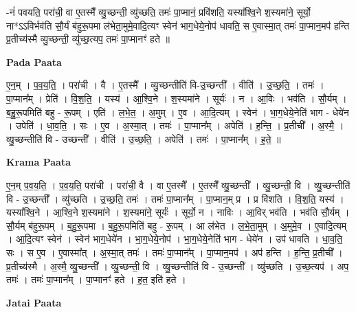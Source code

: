 \documentclass[17pt]{extarticle}
\begin{document}
-नं॑ पवयति॒ परा॑ची॒ वा ए॒तस्मै᳚ व्यु॒च्छन्ती॒ व्यु॑च्छति॒ तमः॑ पा॒प्मानं॒ प्रवि॑शति॒ यस्या᳚श्वि॒ने श॒स्यमा॑ने॒ सूर्यो॒ ना*ऽऽविर्भव॑ति सौ॒र्यं ब॑हुरू॒पमा ल॑भेता॒मुमे॒वादि॒त्यꣳ स्वेन॑ भाग॒धेये॒नोप॑ धावति॒ स ए॒वास्मा॒त् तमः॑ पा॒प्मान॒मप॑ हन्ति प्र॒तीच्य॑स्मै व्यु॒च्छन्ती॒ व्यु॑च्छ॒त्यप॒ तमः॑ पा॒प्मानꣳ॑ हते ॥ \newline

\textbf{Pada Paata} \newline

ए॒न॒म् । प॒व॒य॒ति॒ । परा॑ची । वै । ए॒तस्मै᳚ । व्यु॒च्छन्तीति॑ वि-उ॒च्छन्ती᳚ । वीति॑ । उ॒च्छ॒ति॒ । तमः॑ । पा॒प्मान᳚म् । प्रेति॑ । वि॒श॒ति॒ । यस्य॑ । आ॒श्वि॒ने । श॒स्यमा॑ने । सूर्यः॑ । न । आ॒विः । भव॑ति । सौ॒र्यम् । ब॒हु॒रू॒पमिति॑ बहु - रू॒पम् । एति॑ । ल॒भे॒त॒ । अ॒मुम् । ए॒व । आ॒दि॒त्यम् । स्वेन॑ । भा॒ग॒धेये॒नेति॑ भाग - धेये॑न । उपेति॑ । धा॒व॒ति॒ । सः । ए॒व । अ॒स्मा॒त् । तमः॑ । पा॒प्मान᳚म् । अपेति॑ । ह॒न्ति॒ । प्र॒तीची᳚ । अ॒स्मै॒ । व्यु॒च्छन्तीति॑ वि - उच्छन्ती᳚ । वीति॑ । उ॒च्छ॒ति॒ । अपेति॑ । तमः॑ । पा॒प्मान᳚म् । ह॒ते॒ ॥  \newline


\textbf{Krama Paata} \newline

ए॒न॒म् प॒व॒य॒ति॒ । प॒व॒य॒ति॒ परा॑ची । परा॑ची॒ वै । वा ए॒तस्मै᳚ । ए॒तस्मै᳚ व्यु॒च्छन्ती᳚ । व्यु॒च्छन्ती॒ वि । व्यु॒च्छन्तीति॑ वि - उ॒च्छन्ती᳚ । व्यु॑च्छति । उ॒च्छ॒ति॒ तमः॑ । तमः॑ पा॒प्मान᳚म् । पा॒प्मान॒म् प्र । प्र वि॑शति । वि॒श॒ति॒ यस्य॑ । यस्या᳚श्वि॒ने । आ॒श्वि॒ने श॒स्यमा॑ने । श॒स्यमा॑ने॒ सूर्यः॑ । सूर्यो॒ न । नाविः । आ॒विर् भव॑ति । भव॑ति सौ॒र्यम् । सौ॒र्यम् ब॑हुरू॒पम् । ब॒हु॒रू॒पमा । ब॒हु॒रू॒पमिति॑ बहु - रू॒पम् । आ ल॑भेत । ल॒भे॒ता॒मुम् । अ॒मुमे॒व । ए॒वादि॒त्यम् । आ॒दि॒त्यꣳ स्वेन॑ । स्वेन॑ भाग॒धेये॑न । भा॒ग॒धेये॒नोप॑ । भा॒ग॒धेये॒नेति॑ भाग - धेये॑न । उप॑ धावति । धा॒व॒ति॒ सः । स ए॒व । ए॒वास्मा᳚त् । अ॒स्मा॒त् तमः॑ । तमः॑ पा॒प्मान᳚म् । पा॒प्मान॒मप॑ । अप॑ हन्ति । ह॒न्ति॒ प्र॒तीची᳚ । प्र॒तीच्य॑स्मै । अ॒स्मै॒ व्यु॒च्छन्ती᳚ । व्यु॒च्छन्ती॒ वि । व्यु॒च्छन्तीति॑ वि - उ॒च्छन्ती᳚ । व्यु॑च्छति । उ॒च्छ॒त्यप॑ । अप॒ तमः॑ । तमः॑ पा॒प्मान᳚म् । पा॒प्मानꣳ॑ हते । ह॒त॒ इति॑ हते । \newline

\textbf{Jatai Paata} \newline
\end{document}
